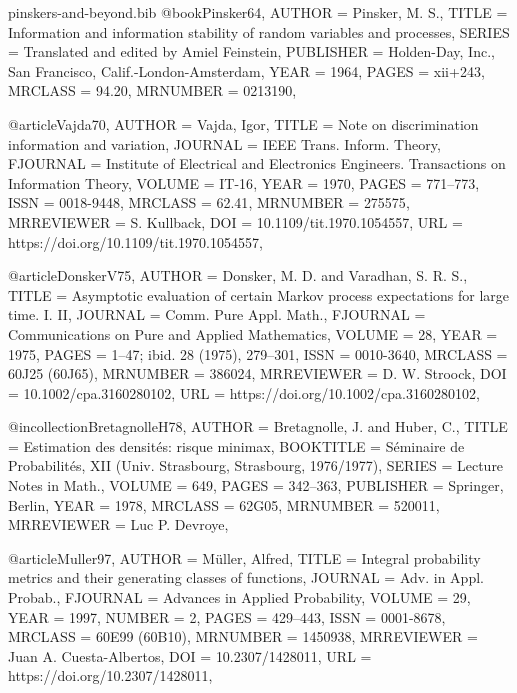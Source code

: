 \documentclass[10pt]{article}
\begin{document}
\begin{filecontents}{pinskers-and-beyond.bib}
@book{Pinsker64,
    AUTHOR = {Pinsker, M. S.},
     TITLE = {Information and information stability of random variables and
              processes},
    SERIES = {Translated and edited by Amiel Feinstein},
 PUBLISHER = {Holden-Day, Inc., San Francisco, Calif.-London-Amsterdam},
      YEAR = {1964},
     PAGES = {xii+243},
   MRCLASS = {94.20},
  MRNUMBER = {0213190},
}


@article{Vajda70,
    AUTHOR = {Vajda, Igor},
     TITLE = {Note on discrimination information and variation},
   JOURNAL = {IEEE Trans. Inform. Theory},
  FJOURNAL = {Institute of Electrical and Electronics Engineers.
              Transactions on Information Theory},
    VOLUME = {IT-16},
      YEAR = {1970},
     PAGES = {771--773},
      ISSN = {0018-9448},
   MRCLASS = {62.41},
  MRNUMBER = {275575},
MRREVIEWER = {S. Kullback},
       DOI = {10.1109/tit.1970.1054557},
       URL = {https://doi.org/10.1109/tit.1970.1054557},
}

@article{DonskerV75,
    AUTHOR = {Donsker, M. D. and Varadhan, S. R. S.},
     TITLE = {Asymptotic evaluation of certain {M}arkov process expectations
              for large time. {I}. {II}},
   JOURNAL = {Comm. Pure Appl. Math.},
  FJOURNAL = {Communications on Pure and Applied Mathematics},
    VOLUME = {28},
      YEAR = {1975},
     PAGES = {1--47; ibid. 28 (1975), 279--301},
      ISSN = {0010-3640},
   MRCLASS = {60J25 (60J65)},
  MRNUMBER = {386024},
MRREVIEWER = {D. W. Stroock},
       DOI = {10.1002/cpa.3160280102},
       URL = {https://doi.org/10.1002/cpa.3160280102},
}

@incollection{BretagnolleH78,
    AUTHOR = {Bretagnolle, J. and Huber, C.},
     TITLE = {Estimation des densit\'{e}s: risque minimax},
 BOOKTITLE = {S\'{e}minaire de {P}robabilit\'{e}s, {XII} ({U}niv. {S}trasbourg,
              {S}trasbourg, 1976/1977)},
    SERIES = {Lecture Notes in Math.},
    VOLUME = {649},
     PAGES = {342--363},
 PUBLISHER = {Springer, Berlin},
      YEAR = {1978},
   MRCLASS = {62G05},
  MRNUMBER = {520011},
MRREVIEWER = {Luc P. Devroye},
}

@article{Muller97,
    AUTHOR = {M{\"{u}}ller, Alfred},
     TITLE = {Integral probability metrics and their generating classes of
              functions},
   JOURNAL = {Adv. in Appl. Probab.},
  FJOURNAL = {Advances in Applied Probability},
    VOLUME = {29},
      YEAR = {1997},
    NUMBER = {2},
     PAGES = {429--443},
      ISSN = {0001-8678},
   MRCLASS = {60E99 (60B10)},
  MRNUMBER = {1450938},
MRREVIEWER = {Juan A. Cuesta-Albertos},
       DOI = {10.2307/1428011},
       URL = {https://doi.org/10.2307/1428011},
}


\end{filecontents}
\end{document}

